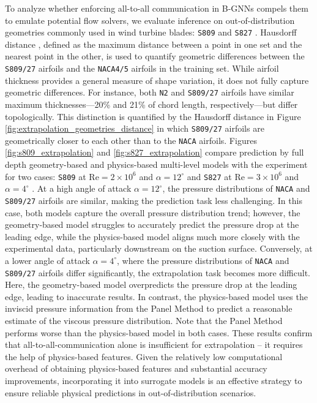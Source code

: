 \documentclass{marine_2025_paper_template}
\begin{document}
\noindent To analyze whether enforcing all-to-all communication in B-GNNs compels them to emulate potential flow solvers, we evaluate inference on out-of-distribution geometries commonly used in wind turbine blades: \texttt{S809} \citep{somers1997} and \texttt{S827} \citep{somers2005}. Hausdorff distance \citep{rote1991}, defined as the maximum distance between a point in one set and the nearest point in the other, is used to quantify geometric differences between the \texttt{S809/27} airfoils and the \texttt{NACA4/5} airfoils in the training set. While airfoil thickness provides a general measure of shape variation, it does not fully capture geometric differences. For instance, both \texttt{N2} and \texttt{S809/27} airfoils have similar maximum thicknesses—20\% and 21\% of chord length, respectively—but differ topologically. This distinction is quantified by the Hausdorff distance in Figure \ref{fig:extrapolation_geometries_distance} in which \texttt{S809/27} airfoils are geometrically closer to each other than to the \texttt{NACA} airfoils. Figures \ref{fig:s809_extrapolation} and \ref{fig:s827_extrapolation} compare prediction by full depth geometry-based and physics-based multi-level models with the experiment for two cases: \texttt{S809} at $\mathrm{Re}=2 \times 10^6$ and $\alpha = 12^{\circ}$ \citep{somers1997} and \texttt{S827} at $\mathrm{Re}=3 \times 10^6$ and $\alpha = 4^{\circ}$ \citep{somers2005}. At a high angle of attack $\alpha=12^{\circ}$, the pressure distributions of \texttt{NACA} and \texttt{S809/27} airfoils are similar, making the prediction task less challenging. In this case, both models capture the overall pressure distribution trend; however, the geometry-based model struggles to accurately predict the pressure drop at the leading edge, while the physics-based model aligns much more closely with the experimental data, particularly downstream on the suction surface. Conversely, at a lower angle of attack $\alpha=4^{\circ}$, where the pressure distributions of \texttt{NACA} and \texttt{S809/27} airfoils differ significantly, the extrapolation task becomes more difficult. Here, the geometry-based model overpredicts the pressure drop at the leading edge, leading to inaccurate results. In contrast, the physics-based model uses the inviscid pressure information from the Panel Method to predict a reasonable estimate of the viscous pressure distribution. Note that the Panel Method performs worse than the physics-based model in both cases. These results confirm that all-to-all-communication alone is insufficient for extrapolation -- it requires the help of physics-based features. Given the relatively low computational overhead of obtaining physics-based features and substantial accuracy improvements, incorporating it into surrogate models is an effective strategy to ensure reliable physical predictions in out-of-distribution scenarios.
\end{document}
